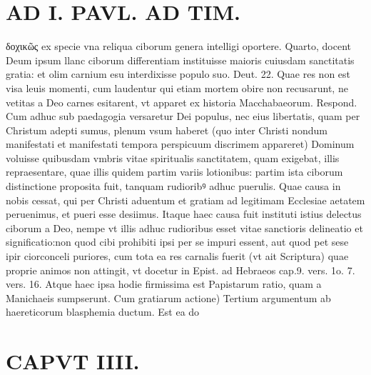 \documentclass{article}
\begin{document}
\begin{pages}
\section*{AD I. PAVL. AD TIM. }
\marginpar{[ p.194 ]}\pstart δοχικῶς ex specie vna reliqua ciborum genera intelligi oportere. Quarto, docent Deum ipsum llanc ciborum differentiam instituisse maioris cuiusdam sanctitatis gratia: et olim carnium esu interdixisse populo suo. Deut. 22. Quae res non est visa leuis momenti, cum laudentur qui etiam mortem obire non recusarunt, ne vetitas a Deo carnes esitarent, vt apparet ex historia Macchabaeorum. Respond. Cum adhuc sub paedagogia versaretur Dei populus, nec eius libertatis, quam per Christum adepti sumus, plenum vsum haberet (quo inter Christi nondum manifestati et manifestati tempora perspicuum discrimem appareret) Dominum voluisse quibusdam vmbris vitae spiritualis sanctitatem, quam exigebat, illis repraesentare, quae illis quidem partim variis lotionibus: partim ista ciborum distinctione proposita fuit, tanquam rudioribꝰ adhuc puerulis. Quae causa in nobis cessat, qui per Christi aduentum et gratiam ad legitimam Ecclesiae aetatem peruenimus, et pueri esse desiimus. Itaque haec causa fuit instituti istius delectus ciborum a Deo, nempe vt illis adhuc rudioribus esset vitae sanctioris delineatio et significatio:non quod cibi prohibiti ipsi per se impuri essent, aut quod pet sese ipir ciorconceli puriores, cum tota ea res carnalis fuerit (vt ait Scriptura) quae proprie animos non attingit, vt docetur in Epist. ad Hebraeos cap.9. vers. 1o. 7. vers. 16. Atque haec ipsa hodie firmissima est Papistarum ratio, quam a Manichaeis sumpserunt. Cum gratiarum actione) Tertium argumentum ab haereticorum blasphemia ductum. Est ea do\pend
\section*{CAPVT  IIII. }
\marginpar{[ p.195 ]}\pstart {}
{}

\end{pages}
\end{document}
